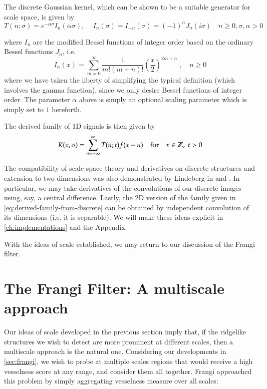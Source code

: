     \begin{defn}
    	The discrete Gaussian kernel, which can be shown to be a suitable generator
    	for scale space, is given by
    	\begin{equation}
    	T(n;\sigma) = e^{-\alpha \sigma} I_n(\alpha \sigma) ,\quad\,
    	 I_n(\sigma) = I_{-n}(\sigma) = (-1)^n J_n(i\sigma) 
    	 \quad n \ge 0 , \sigma,\alpha > 0
    	 \end{equation}
    \end{defn}
    where $I_n$ are the modified Bessel functions of integer order based on the
    ordinary Bessel functions $J_n$, i.e.
    \[
    I_n(x) = \sum_{m=0}^{\infty} \frac{1}{m! (m+n)!}
	    	\left(\frac{x}{2}\right)^{2m+n} \;,\quad n \ge 0
    \]
    where we have taken the liberty of simplifying the typical definition \cite{abramowitz-stegun} (which involves the gamma function), since we only desire
    Bessel functions of integer order. The parameter $\alpha$ above is simply an
    optional scaling parameter which is simply set to $1$ hereforth.
    
    The derived family of 1D signals is then given by
\begin{equation} \label{eq:derived-family-from-discrete}
        K(x,\sigma) = \sum_{n=-\infty}^{\infty} T(n;t) f(x-n)
        \quad \textrm{for} \quad x \in \mathbb{Z}, \; t > 0
        \end{equation}
    
    The compatibility of scale space theory and derivatives on discrete structures and     extension to two dimensions was also demonstrated by Lindeberg in \cite{lindeberg-discrete-derivative} and \cite{lindeberg1998feature}. In particular, we may take derivatives of the convolutions of our discrete images
    using, say, a central difference.
    Lastly, the 2D version of the family given in \cref{eq:derived-family-from-discrete} can be obtained by independent convolution of its dimensions (i.e. it is separable). We will make these
    ideas explicit in \cref{ch:implementations} and the Appendix.
    
    With the ideas of scale established, we may return to our discussion of the Frangi filter.
    
    \section{The Frangi Filter: A multiscale approach} \label{sec:frangi-multiscale}
    
    Our ideas of scale developed in the previous section imply that, if the ridgelike structures we wish to detect are more prominent at different scales, then a multiscale approach is the natural one. Considering our
    developments in \cref{sec:frangi}, we wish to probe at multiple scales
    regions that would receive a high vesselness score at any range,
    and consider them all together. Frangi \cite{frangi-paper} approached this problem by simply aggregating vesselness measure over all scales:
    
